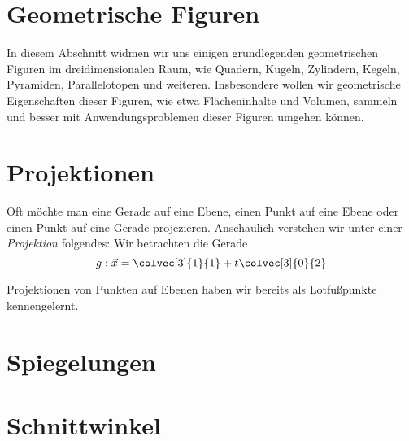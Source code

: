 \section{Geometrische Figuren}
In diesem Abschnitt widmen wir uns einigen grundlegenden geometrischen Figuren im dreidimensionalen Raum, wie Quadern, Kugeln, Zylindern, Kegeln, Pyramiden, Parallelotopen und weiteren. Insbesondere wollen wir geometrische Eigenschaften dieser Figuren, wie etwa Flächeninhalte und Volumen, sammeln und besser mit Anwendungsproblemen dieser Figuren umgehen können. 

\section{Projektionen}
Oft möchte man eine Gerade auf eine Ebene, einen Punkt auf eine Ebene oder einen Punkt auf eine Gerade projezieren. Anschaulich verstehen wir unter einer \textit{Projektion} folgendes: Wir betrachten die Gerade 
\begin{equation*}
    g: \vec x = \colvec[3]{1}{1} + t\colvec[3]{0}{2}
\end{equation*}

Projektionen von Punkten auf Ebenen haben wir bereits als Lotfußpunkte kennengelernt. 

\section{Spiegelungen}

\section{Schnittwinkel}


